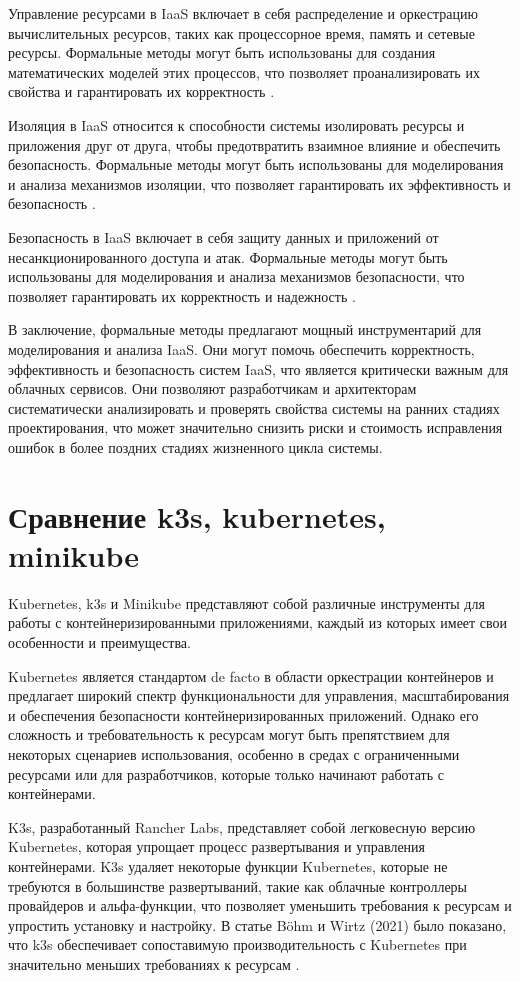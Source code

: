 Управление ресурсами в IaaS включает в себя распределение и
оркестрацию вычислительных ресурсов, таких как процессорное время,
память и сетевые ресурсы. Формальные методы могут быть использованы
для создания математических моделей этих процессов, что позволяет
проанализировать их свойства и гарантировать их корректность
\cite{de2012formal, turin2023predicting}.

Изоляция в IaaS относится к способности системы изолировать ресурсы и
приложения друг от друга, чтобы предотвратить взаимное влияние и
обеспечить безопасность. Формальные методы могут быть использованы
для моделирования и анализа механизмов изоляции, что позволяет
гарантировать их эффективность и безопасность \cite{bijon2014formal}.

Безопасность в IaaS включает в себя защиту данных и приложений от
несанкционированного доступа и атак. Формальные методы могут быть
использованы для моделирования и анализа механизмов безопасности,
что позволяет гарантировать их корректность и надежность
\cite{amato2018improving}.

В заключение, формальные методы предлагают мощный инструментарий для
моделирования и анализа IaaS. Они могут помочь обеспечить корректность,
эффективность и безопасность систем IaaS, что является критически важным
для облачных сервисов. Они позволяют разработчикам и архитекторам
систематически анализировать и проверять свойства системы на ранних
стадиях проектирования, что может значительно снизить риски и стоимость
исправления ошибок в более поздних стадиях жизненного цикла системы.

\section{Сравнение k3s, kubernetes, minikube}

Kubernetes, k3s и Minikube представляют собой различные инструменты
для работы с контейнеризированными приложениями, каждый из которых
имеет свои особенности и преимущества.

Kubernetes является стандартом de facto в области оркестрации
контейнеров и предлагает широкий спектр функциональности для управления,
масштабирования и обеспечения безопасности контейнеризированных
приложений. Однако его сложность и требовательность к ресурсам могут
быть препятствием для некоторых сценариев использования, особенно в
средах с ограниченными ресурсами или для разработчиков, которые только
начинают работать с контейнерами.

K3s, разработанный Rancher Labs, представляет собой легковесную версию
Kubernetes, которая упрощает процесс развертывания и управления
контейнерами. K3s удаляет некоторые функции Kubernetes, которые
не требуются в большинстве развертываний, такие как облачные
контроллеры провайдеров и альфа-функции, что позволяет уменьшить
требования к ресурсам и упростить установку и настройку. В статье
Böhm и Wirtz (2021) было показано, что k3s обеспечивает
сопоставимую производительность с Kubernetes при значительно
меньших требованиях к ресурсам \cite{bohm2021profiling}.

